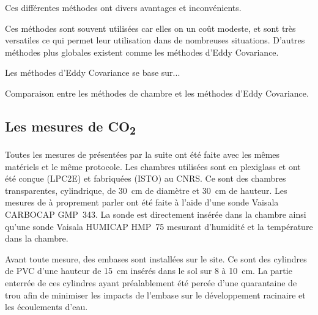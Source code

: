 Ces différentes méthodes ont divers avantages et inconvénients.

Ces méthodes sont souvent utilisées car elles on un coût modeste, et sont très versatiles ce qui permet leur utilisation dans de nombreuses situations.
D'autres méthodes plus globales existent comme les méthodes d'Eddy Covariance.

Les méthodes d'Eddy Covariance se base sur...

Comparaison entre les méthodes de chambre et les méthodes d'Eddy Covariance.

\subsection{Les mesures de \texorpdfstring{CO\textsubscript{2}}{CO2}}

Toutes les mesures de \coo présentées par la suite ont été faite avec les mêmes matériels et le même protocole.
Les chambres utilisées sont en plexiglass et ont été conçue (LPC2E) et fabriquées (ISTO) au CNRS.
Ce sont des chambres transparentes, cylindrique, de \SI{30}{\centi\metre} de diamètre et \SI{30}{\centi\metre} de hauteur.
Les mesures de \coo à proprement parler ont été faite à l'aide d'une sonde Vaisala CARBOCAP\textsuperscript{\textregistered} GMP~343.
La sonde est directement insérée dans la chambre ainsi qu'une sonde Vaisala HUMICAP\textsuperscript{\textregistered} HMP~75 mesurant d'humidité et la température dans la chambre.

Avant toute mesure, des embases sont installées sur le site.
Ce sont des cylindres de PVC d'une hauteur de \SI{15}{\centi\metre} insérés dans le sol sur 8 à \SI{10}{\centi\metre}.
La partie enterrée de ces cylindres ayant préalablement été percée d'une quarantaine de trou afin de minimiser les impacts de l'embase sur le développement racinaire et les écoulements d'eau.

